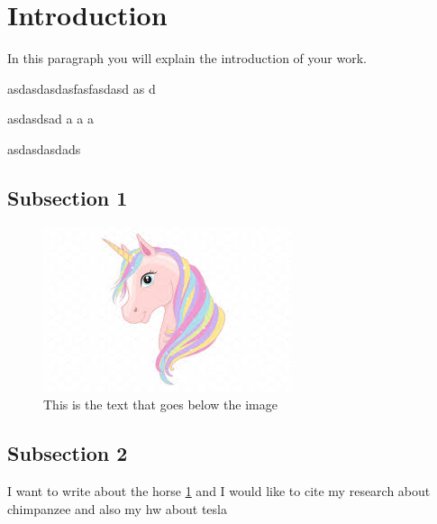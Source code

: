 \documentclass[a4paper, 12pt]{article} %
\begin{document}
\tableofcontents %

\newpage %


\section{Introduction} %

In this paragraph you will explain the introduction of your work. 

asdasdasdasfasfasdasd as d

asdasdsad
a
a
a



asdasdasdads

\subsection{Subsection 1} %

\begin{figure}[H] %
	\begin{center}
		\includegraphics[scale=1]{img/unicorn.jpeg}
	\caption{This is the text that goes below the image}
	\label{fig:horse}
	\end{center}
\end{figure}


\subsection{Subsection 2} %
I want to write about the horse \ref{fig:horse} and I would like to cite my research about chimpanzee \cite{laland2009question} and also my hw about tesla \cite{vujovic1998tesla}
\end{document}
